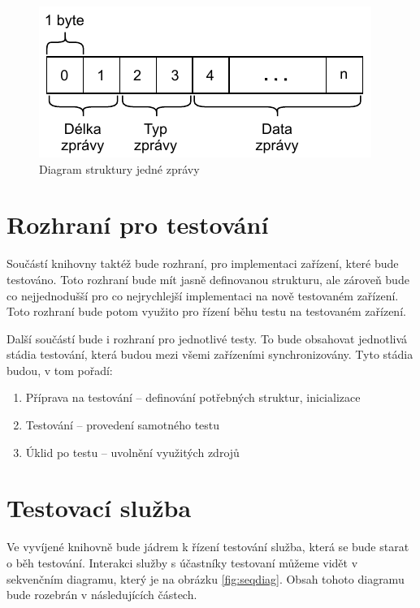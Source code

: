 \begin{figure}[htbp]
    \centering 
    \includegraphics{assets/img/message.pdf}
    \caption{Diagram struktury jedné zprávy}
    \label{fig:message}
\end{figure}



\section{Rozhraní pro testování}
Součástí knihovny taktéž bude rozhraní, pro implementaci zařízení, které bude testováno. Toto rozhraní bude mít jasně definovanou  strukturu, ale zároveň bude co nejjednodušší pro co nejrychlejší implementaci na nově testovaném zařízení. Toto rozhraní bude potom využito pro řízení běhu testu na testovaném zařízení. 

Další součástí bude i rozhraní pro jednotlivé testy. To bude obsahovat jednotlivá stádia testování, která budou mezi všemi zařízeními synchronizovány. Tyto stádia budou, v tom pořadí:
\begin{enumerate}
    \item Příprava na testování -- definování potřebných struktur, inicializace
    \item Testování -- provedení samotného testu
    \item Úklid po testu -- uvolnění využitých zdrojů
\end{enumerate}

\section{Testovací služba}
Ve vyvíjené knihovně bude jádrem k řízení testování služba, která se bude starat o běh testování. Interakci služby s účastníky testovaní můžeme vidět v sekvenčním diagramu, který je na obrázku \ref{fig:seqdiag}. Obsah tohoto diagramu bude rozebrán v následujících částech.

